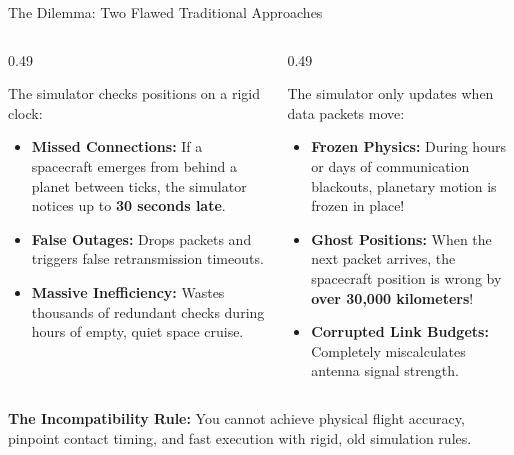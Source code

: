 \documentclass[aspectratio=169,10pt]{beamer}
\begin{document}
\begin{frame}{The Dilemma: Two Flawed Traditional Approaches}
  \begin{columns}[T]
    \begin{column}{0.49\textwidth}
      \begin{tcolorbox}[colback=lightRed,colframe=alertRed,title=\textbf{Approach A: Rigid Fixed Ticks (e.g., Every 60s)}]
        \small
        The simulator checks positions on a rigid clock:
        \begin{itemize}\setlength{\itemsep}{1.2pt}
          \item \textbf{Missed Connections:} If a spacecraft emerges from behind a planet between ticks, the simulator notices up to \textbf{30 seconds late}.
          \item \textbf{False Outages:} Drops packets and triggers false retransmission timeouts.
          \item \textbf{Massive Inefficiency:} Wastes thousands of redundant checks during hours of empty, quiet space cruise.
        \end{itemize}
      \end{tcolorbox}
    \end{column}

    \begin{column}{0.49\textwidth}
      \begin{tcolorbox}[colback=lightGold,colframe=goldAccent,title=\textbf{Approach B: Pure Event-Driven (Only on Packets)}]
        \small
        The simulator only updates when data packets move:
        \begin{itemize}\setlength{\itemsep}{1.2pt}
          \item \textbf{Frozen Physics:} During hours or days of communication blackouts, planetary motion is frozen in place!
          \item \textbf{Ghost Positions:} When the next packet arrives, the spacecraft position is wrong by \textbf{over 30,000 kilometers}!
          \item \textbf{Corrupted Link Budgets:} Completely miscalculates antenna signal strength.
        \end{itemize}
      \end{tcolorbox}
    \end{column}
  \end{columns}

  \vspace{2pt}
  \begin{tcolorbox}[colback=spaceNavy,colframe=spaceNavy,top=1.5pt,bottom=1.5pt]
    \centering\small\color{white}
    \textbf{The Incompatibility Rule:} You cannot achieve physical flight accuracy, pinpoint contact timing, and fast execution with rigid, old simulation rules.
  \end{tcolorbox}
\end{frame}
\end{document}
